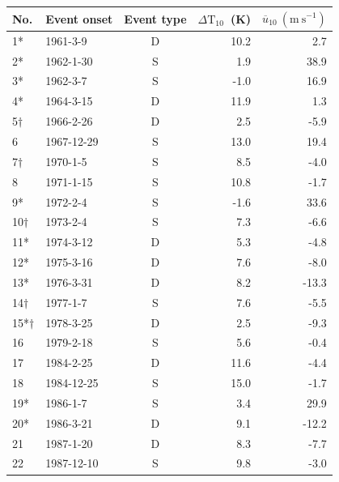 \begin{table}
  \begin{centering}
    \begin{tabular}{llcrr}  \hline
    No. & Event onset & Event type & $\Delta \mathrm{T}_{10}$~(K) &
                                                                    $\overline{u}_{10}~(\mathrm{m~s^{-1}})$ \\ \hline
    1*  & 1961-3-9    & D          & 10.2       & 2.7 \\
    2*  & 1962-1-30   & S          & 1.9        & 38.9 \\
    3*  & 1962-3-7    & S          & -1.0       & 16.9 \\
    4*  & 1964-3-15   & D          & 11.9       & 1.3 \\
    5$\dagger$  & 1966-2-26   & D          & 2.5        & -5.9 \\
    6   & 1967-12-29  & S          & 13.0       & 19.4 \\
    7$\dagger$   & 1970-1-5    & S          & 8.5        & -4.0 \\
    8   & 1971-1-15   & S          & 10.8       & -1.7 \\
    9*  & 1972-2-4    & S          & -1.6       & 33.6 \\
    10$\dagger$  & 1973-2-4    & S          & 7.3        & -6.6 \\
    11* & 1974-3-12   & D          & 5.3        & -4.8 \\
    12* & 1975-3-16   & D          & 7.6        & -8.0 \\
    13* & 1976-3-31   & D          & 8.2        & -13.3 \\
    14$\dagger$  & 1977-1-7    & S          & 7.6        & -5.5 \\
    15*$\dagger$ & 1978-3-25   & D          & 2.5        & -9.3 \\
    16  & 1979-2-18   & S          & 5.6        & -0.4 \\
    17  & 1984-2-25   & D          & 11.6       & -4.4 \\
    18  & 1984-12-25  & S          & 15.0       & -1.7 \\
    19* & 1986-1-7    & S          & 3.4        & 29.9 \\
    20* & 1986-3-21   & D          & 9.1        & -12.2 \\
    21  & 1987-1-20   & D          & 8.3        & -7.7 \\
    22  & 1987-12-10  & S          & 9.8        & -3.0 \\

\end{tabular}
\end{centering}
\end{table}
